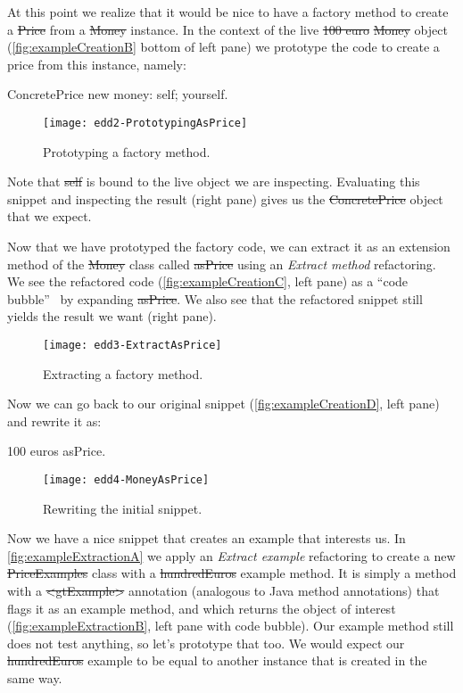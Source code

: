 \documentclass[acmsmall,screen,authorversion,nonacm]{acmart} %
\begin{document}
At this point we realize that it would be nice to have a factory method to create a \st{Price} from a \st{Money} instance.
In the context of the live \st{100 euro} \st{Money} object (\autoref{fig:exampleCreationB} bottom of left pane) we prototype the code to create a price from this instance, namely:
\begin{code}
ConcretePrice new money: self; yourself.
\end{code}

\begin{figure}[h]
  \texttt{[image: edd2-PrototypingAsPrice]}
	\caption{Prototyping a factory method.}
  \label{fig:exampleCreationB}
\end{figure}

Note that \st{self} is bound to the live object we are inspecting.
Evaluating this snippet and inspecting the result (right pane) gives us the \st{ConcretePrice} object that we expect.

Now that we have prototyped the factory code, we can extract it as an extension method of the \st{Money} class called \st{asPrice} using an \emph{Extract method} refactoring.
We see the refactored code (\autoref{fig:exampleCreationC}, left pane) as a ``code bubble''~\cite{Brag10a} by expanding \st{asPrice}.
We also see that the refactored snippet still yields the result we want (right pane).

\begin{figure}[h]
  \texttt{[image: edd3-ExtractAsPrice]}
	\caption{Extracting a factory method.}
  \label{fig:exampleCreationC}
\end{figure}

Now we can go back to our original snippet (\autoref{fig:exampleCreationD}, left pane) and rewrite it as:
\begin{code}
100 euros asPrice.
\end{code}

\begin{figure}[h]
  \texttt{[image: edd4-MoneyAsPrice]}
	\caption{Rewriting the initial snippet.}
  \label{fig:exampleCreationD}
\end{figure}

Now we have a nice snippet that creates an example that interests us.
In \autoref{fig:exampleExtractionA} we apply an \emph{Extract example} refactoring to create a new \st{PriceExamples} class with a \st{hundredEuros} example  method.
It is simply a method with a \st{<gtExample>} annotation (analogous to Java method annotations) that flags it as an example method, and which returns the object of interest (\autoref{fig:exampleExtractionB}, left pane with code bubble).
Our example method still does not test anything, so let's prototype that too.
We would expect our \st{hundredEuros} example to be equal to another instance that is created in the same way.
\end{document}
